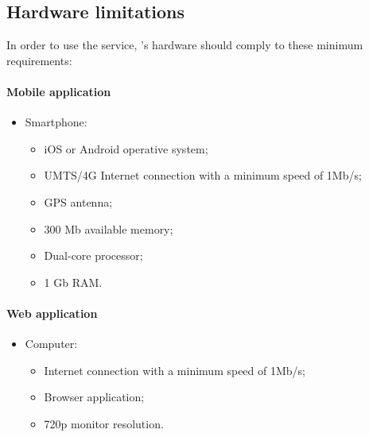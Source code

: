 \documentclass[../../../rasd.tex]{subfiles}
\begin{document}
\subsection{Hardware limitations\label{sect:3.4.2}}


In order to use the service, ’s hardware should comply to these minimum requirements:

\paragraph{Mobile application}
\begin{itemize}
	\item Smartphone:
		\begin{itemize}
			\item iOS or Android operative system;
			\item UMTS/4G Internet connection with a minimum speed of 1Mb/s; 
			\item GPS antenna;
			\item 300 Mb available memory;
			\item Dual-core processor;
			\item 1 Gb RAM.
		\end{itemize}
\end{itemize}

\paragraph{Web application}
\begin{itemize}
	\item Computer:
	\begin{itemize}
		\item Internet connection with a minimum speed of 1Mb/s; 
		\item Browser application;
		\item 720p monitor resolution.
	\end{itemize}
\end{itemize}
\end{document}
